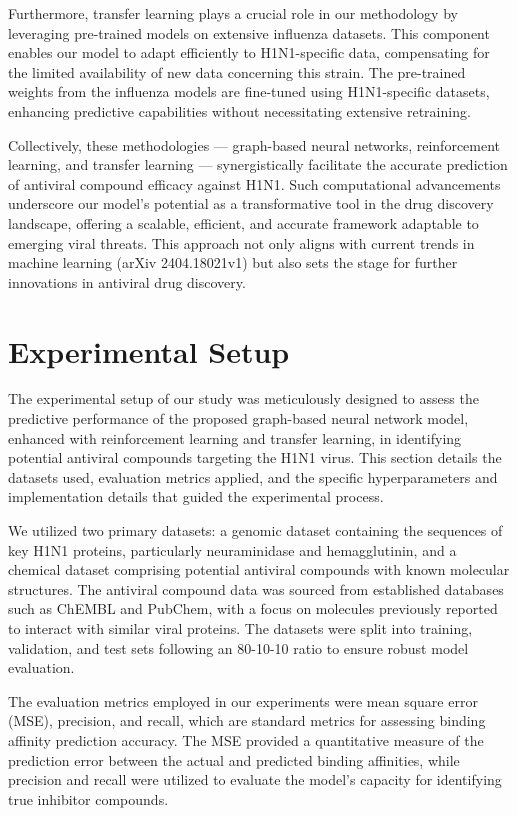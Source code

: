 \documentclass{article}
\begin{document}
Furthermore, transfer learning plays a crucial role in our methodology by leveraging pre-trained models on extensive influenza datasets. This component enables our model to adapt efficiently to H1N1-specific data, compensating for the limited availability of new data concerning this strain. The pre-trained weights from the influenza models are fine-tuned using H1N1-specific datasets, enhancing predictive capabilities without necessitating extensive retraining.

Collectively, these methodologies — graph-based neural networks, reinforcement learning, and transfer learning — synergistically facilitate the accurate prediction of antiviral compound efficacy against H1N1. Such computational advancements underscore our model's potential as a transformative tool in the drug discovery landscape, offering a scalable, efficient, and accurate framework adaptable to emerging viral threats. This approach not only aligns with current trends in machine learning (arXiv 2404.18021v1) but also sets the stage for further innovations in antiviral drug discovery.

\section{Experimental Setup}
The experimental setup of our study was meticulously designed to assess the predictive performance of the proposed graph-based neural network model, enhanced with reinforcement learning and transfer learning, in identifying potential antiviral compounds targeting the H1N1 virus. This section details the datasets used, evaluation metrics applied, and the specific hyperparameters and implementation details that guided the experimental process.

We utilized two primary datasets: a genomic dataset containing the sequences of key H1N1 proteins, particularly neuraminidase and hemagglutinin, and a chemical dataset comprising potential antiviral compounds with known molecular structures. The antiviral compound data was sourced from established databases such as ChEMBL and PubChem, with a focus on molecules previously reported to interact with similar viral proteins. The datasets were split into training, validation, and test sets following an 80-10-10 ratio to ensure robust model evaluation.

The evaluation metrics employed in our experiments were mean square error (MSE), precision, and recall, which are standard metrics for assessing binding affinity prediction accuracy. The MSE provided a quantitative measure of the prediction error between the actual and predicted binding affinities, while precision and recall were utilized to evaluate the model's capacity for identifying true inhibitor compounds.
\end{document}
